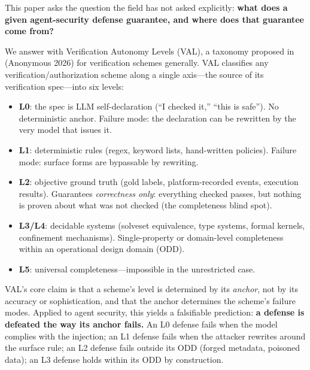 \documentclass[11pt]{article}
\providecommand{\tightlist}{%

  \setlength{\itemsep}{0pt}\setlength{\parskip}{0pt}}
\begin{document}
This paper asks the question the field has not asked explicitly: \textbf{what does a given agent-security defense guarantee, and where does that guarantee come from?}

We answer with Verification Autonomy Levels (VAL), a taxonomy proposed in (Anonymous 2026) for verification schemes generally. VAL classifies any verification/authorization scheme along a single axis---the source of its verification spec---into six levels:

\begin{itemize}

\tightlist

\item

  \textbf{L0}: the spec is LLM self-declaration (``I checked it,'' ``this is safe''). No deterministic anchor. Failure mode: the declaration can be rewritten by the very model that issues it.

\item

  \textbf{L1}: deterministic rules (regex, keyword lists, hand-written policies). Failure mode: surface forms are bypassable by rewriting.

\item

  \textbf{L2}: objective ground truth (gold labels, platform-recorded events, execution results). Guarantees \emph{correctness only}: everything checked passes, but nothing is proven about what was not checked (the completeness blind spot).

\item

  \textbf{L3/L4}: decidable systems (solveset equivalence, type systems, formal kernels, confinement mechanisms). Single-property or domain-level completeness within an operational design domain (ODD).

\item

  \textbf{L5}: universal completeness---impossible in the unrestricted case.

\end{itemize}

VAL's core claim is that a scheme's level is determined by its \emph{anchor}, not by its accuracy or sophistication, and that the anchor determines the scheme's failure modes. Applied to agent security, this yields a falsifiable prediction: \textbf{a defense is defeated the way its anchor fails.} An L0 defense fails when the model complies with the injection; an L1 defense fails when the attacker rewrites around the surface rule; an L2 defense fails outside its ODD (forged metadata, poisoned data); an L3 defense holds within its ODD by construction.
\end{document}
